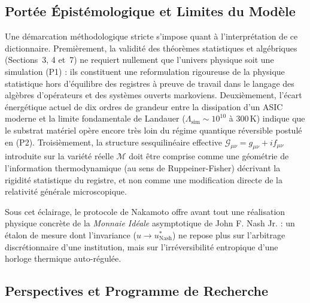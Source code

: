 \documentclass[10pt,twocolumn,a4paper]{article}
\theoremstyle{plain}
\theoremstyle{definition}
\theoremstyle{remark}
\begin{document}
\subsection{Portée Épistémologique et Limites du Modèle}

Une démarcation méthodologique stricte s'impose quant à l'interprétation de ce dictionnaire. Premièrement, la validité des théorèmes statistiques et algébriques (Sections~3, 4 et~7) ne requiert nullement que l'univers physique soit une simulation (P1) : ils constituent une reformulation rigoureuse de la physique statistique hors d'équilibre des registres à preuve de travail dans le langage des algèbres d'opérateurs et des systèmes ouverts markoviens. Deuxièmement, l'écart énergétique actuel de dix ordres de grandeur entre la dissipation d'un ASIC moderne et la limite fondamentale de Landauer ($\Lambda_{\text{sim}} \sim 10^{10}$ à $300\,\text{K}$) indique que le substrat matériel opère encore très loin du régime quantique réversible postulé en (P2). Troisièmement, la structure sesquilinéaire effective $\mathcal{G}_{\mu\nu} = g_{\mu\nu} + i f_{\mu\nu}$ introduite sur la variété réelle $\mathcal{M}$ doit être comprise comme une géométrie de l'information thermodynamique (au sens de Ruppeiner-Fisher) décrivant la rigidité statistique du registre, et non comme une modification directe de la relativité générale microscopique.

Sous cet éclairage, le protocole de Nakamoto offre avant tout une réalisation physique concrète de la \textit{Monnaie Idéale} asymptotique de John F. Nash Jr. \cite{Nash2002} : un étalon de mesure dont l'invariance ($u \to u_{\text{Nash}}^*$) ne repose plus sur l'arbitrage discrétionnaire d'une institution, mais sur l'irréversibilité entropique d'une horloge thermique auto-régulée.

\subsection{Perspectives et Programme de Recherche}
\end{document}
